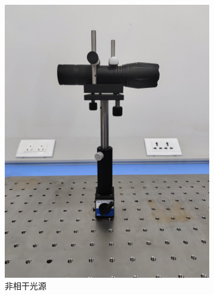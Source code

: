 \documentclass[a4paper]{report} %
\begin{document}
\begin{figure}[htbp]
\begin{subfigure}{0.22\textwidth}
        \includegraphics[width=\linewidth]{非相干光源.jpg}
        \caption{非相干光源}
    \end{subfigure}
    \begin{subfigure}{0.22\textwidth}

\end{subfigure}
\end{figure}
\end{document}
